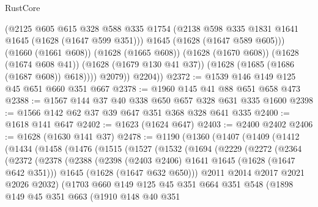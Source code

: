 \begin{lexlean}{RustCore}
\begin{coremodule}
                (@2125
                  @605
                  @615
                  @328
                  @588
                  @335
                  @1754
                  (@2138 @598 @335 @1831 @1641 @1645 (@1628 (@1647 @599 @351)))
                  @1645
                  (@1628 (@1647 @589 @605)))
                (@1660 (@1661 @608))
                (@1628 (@1665 @608))
                (@1628 (@1670 @608))
                (@1628 (@1674 @608 @41))
                (@1628 (@1679 @130 @41 @37))
                (@1628 (@1685 (@1686 (@1687 @608)) @618))))
            @2079))
        @2204))
@2372 := @1539 @146 @149 @125 @45 @651 @660 @351 @667
@2378 := @1960 @145 @41 @88 @651 @658 @473
@2388 := @1567 @144 @37 @40 @338 @650 @657 @328 @631 @335 @1600
@2398 := @1566 @142 @62 @37 @39 @647 @351 @368 @328 @641 @335
@2400 := @1618 @141 @647
@2402 := @1623 (@1624 @647)
@2403 := @2400 @2402
@2406 := @1628 (@1630 @141 @37)
@2478 := @1190
    (@1360
      (@1407
        (@1409
          (@1412
            (@1434
              (@1458
                (@1476
                  (@1515
                    (@1527
                      (@1532
                        (@1694
                          (@2229
                            (@2272
                              (@2364
                                (@2372
                                  (@2378
                                    (@2388
                                      (@2398 (@2403 @2406) @1641 @1645 (@1628 (@1647 @642 @351)))
                                      @1645
                                      (@1628 (@1647 @632 @650)))
                                    @2011
                                    @2014
                                    @2017
                                    @2021
                                    @2026
                                    @2032)
                                  (@1703
                                    @660
                                    @149
                                    @125
                                    @45
                                    @351
                                    @664
                                    @351
                                    @548
                                    (@1898
                                      @149
                                      @45
                                      @351
                                      @663
                                      (@1910
                                        @148
                                        @40
                                        @351

\end{coremodule}
\end{lexlean}
